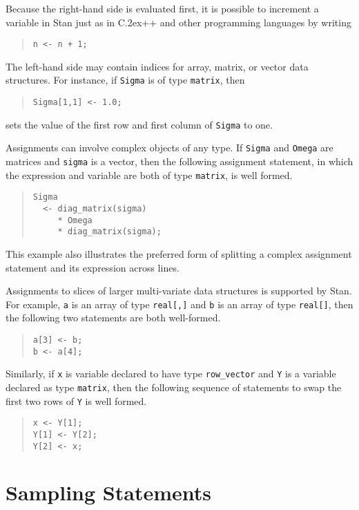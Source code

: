 \documentclass[10pt]{report}
\newcommand{\Stan}{Stan\xspace}
\newcommand*{\Cpp}{C\raise.2ex\hbox{\footnotesize ++}\xspace} %
\newcommand{\code}[1]{{\tt #1}}
\begin{document}
Because the right-hand side is evaluated first, it is possible to
increment a variable in \Stan just as in \Cpp and other programming
languages by writing
%
\begin{quote}
\code{n <- n + 1;}
\end{quote}

The left-hand side may contain indices for array, matrix, or vector
data structures.  For instance, if \code{Sigma} is of type
\code{matrix}, then 
%
\begin{quote}
\code{Sigma[1,1] <- 1.0;}
\end{quote}
%
sets the value of the first row and first column of \code{Sigma} to one.

Assignments can involve complex objects of any type.  If \code{Sigma}
and \code{Omega} are matrices and \code{sigma} is a vector, then the
following assignment statement, in which the expression and variable
are both of type \code{matrix}, is well formed.
%
\begin{quote}
\begin{Verbatim}
Sigma
  <- diag_matrix(sigma) 
     * Omega 
     * diag_matrix(sigma);
\end{Verbatim}
\end{quote}
%
This example also illustrates the preferred form of splitting a
complex assignment statement and its expression across lines.

Assignments to slices of larger multi-variate data structures is
supported by \Stan.  For example, \code{a} is an array of type
\code{real[,]} and \code{b} is an array of type \code{real[]}, then
the following two statements are both well-formed.
%
\begin{quote}
\begin{Verbatim}
a[3] <- b;
b <- a[4];
\end{Verbatim}
\end{quote}
%
Similarly, if \code{x} is variable declared to have type
\code{row\_vector} and \code{Y} is a variable declared as type
\code{matrix}, then the following sequence of statements to swap the
first two rows of \code{Y} is well formed.
%
\begin{quote}
\begin{Verbatim}
x <- Y[1];
Y[1] <- Y[2];
Y[2] <- x;
\end{Verbatim}
\end{quote}

\section{Sampling Statements}
\end{document}
